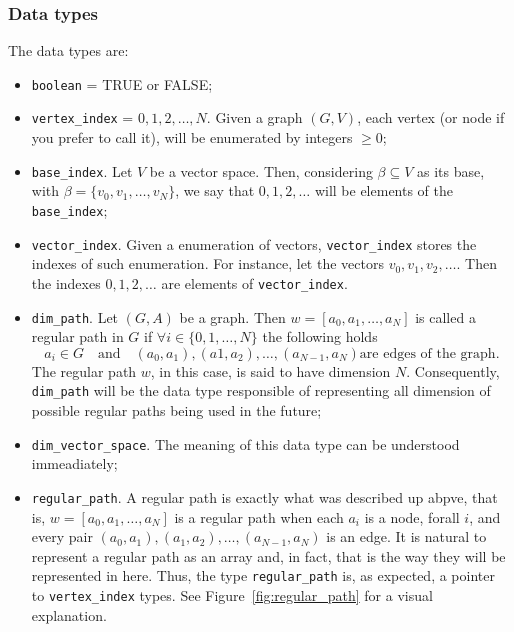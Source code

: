 \documentclass[11pt,a4paper]{article}
\begin{document}
\subsubsection{Data types}
The data types are:
\begin{itemize}
	\item \texttt{boolean} = TRUE or FALSE;

	\item \texttt{vertex\_index} = $0, 1, 2, \ldots, N$. Given a graph $(G,V)$, each vertex (or node
		if you prefer to call it), will be enumerated by integers $\geq 0$;

	\item \texttt{base\_index}. Let $V$ be a vector space. Then, considering $\beta \subseteq V$
		as its base, with $\beta = \{v_0, v_1, \ldots, v_N\}$, we say that
		$0, 1, 2, \ldots$ will be elements of the \texttt{base\_index};

	\item \texttt{vector\_index}. Given a enumeration of vectors, \texttt{vector\_index} stores
		the indexes of such enumeration. For instance, let the vectors $v_0, v_1, v_2, \ldots$.
		Then the indexes $0,1,2,\ldots$ are elements of \texttt{vector\_index}.

	\item \texttt{dim\_path}. Let $(G,A)$ be a graph. Then $w = [a_0, a_1, \ldots, a_N]$
		is called a regular path in $G$ if $\forall i \in \{0, 1, \ldots, N\}$ the following holds
		\[
			a_i \in G \quad \text{and} \quad (a_0, a_1), (a1, a_2), \ldots, (a_{N-1}, a_{N}) 
			\text{are edges of the graph}.
		\]
		The regular path $w$, in this case, is said to have dimension $N$. Consequently, \texttt{dim\_path}
		will be the data type responsible of representing all dimension of possible regular paths
		being used in the future;

	\item \texttt{dim\_vector\_space}. The meaning of this data type can be understood immeadiately;

	\item \texttt{regular\_path}. A regular path is exactly what was described up abpve,
		that is, $w = [a_0, a_1, \ldots, a_N]$ is a regular path when each $a_i$ is a node, forall $i$,
		and every pair $(a_0,a_1), (a_1, a_2), \ldots, (a_{N-1}, a_N)$ is an edge. It is natural to represent
		a regular path as an array and, in fact, that is the way they will be represented in
		here. Thus, the type 
		\texttt{regular\_path} is, as expected, a pointer to \texttt{vertex\_index} types.
		See Figure~\ref{fig:regular_path} for a visual explanation.
		\begin{figure}
\end{figure}
\end{itemize}
\end{document}
